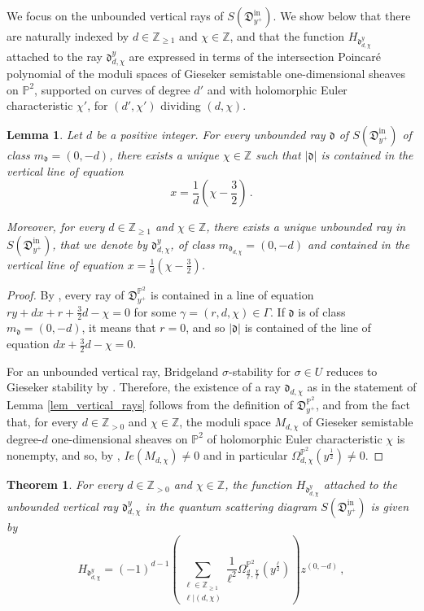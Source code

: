 \documentclass[11pt,letterpaper]{amsart}
\newtheorem{thm}[defn]{Theorem}
\newtheorem{lem}[defn]{Lemma}
\newcommand\PP{\mathbb P}
\newcommand\Z{\mathbb Z}
\newcommand\fd{\mathfrak d}
\newcommand\fD{\mathfrak D}
\newcommand\iin{\mathrm{in}}
\begin{document}
We focus on the unbounded vertical rays of $S(\fD^\iin_{y^+})$. We show below that there are naturally indexed by $d \in \Z_{\geq 1}$ and $\chi \in \Z$, and that the function 
$H_{\fd_{d,\chi}^y}$ attached to the ray $\fd_{d,\chi}^y$ are expressed in terms of the intersection 
Poincar\'e polynomial of the moduli spaces of Gieseker semistable one-dimensional sheaves on $\PP^2$, supported on curves of degree $d'$ and with
holomorphic Euler characteristic $\chi'$, for $(d',\chi')$ dividing $(d,\chi)$.

\begin{lem} \label{lem_vertical_rays_refined}
Let $d$ be a positive integer. For every unbounded ray $\fd$
of $S(\fD^\iin_{y^+})$ of class $m_\fd=(0,-d)$, there exists a unique $\chi \in \Z$ such that $|\fd|$ is contained in the vertical line of equation 
\[ x=\frac{1}{d}\left(\chi-\frac{3}{2}\right)\,.\]

Moreover, for every $d \in \Z_{\geqslant 1}$ and $\chi \in \Z$, there exists a unique unbounded ray in $S(\fD^\iin_{y^+})$, that we denote by
$\fd_{d,\chi}^y$, of class $m_{\fd_{d,\chi}}
=(0,-d)$ and contained in the vertical line of equation $ x=\frac{1}{d}\left(\chi-\frac{3}{2}\right)$.
\end{lem}

\begin{proof}
By \cite[Definition 2.5.7]{bousseau2019scattering}, every ray of $\fD^{\PP^2}_{y^+}$
is contained in a line of equation $ry+dx+r+\frac{3}{2}d-\chi=0$
for some $\gamma=(r,d,\chi)\in \Gamma$. 
If $\fd$ is of class 
$m_\fd=(0,-d)$, it means that $r=0$, and so 
$|\fd|$ is contained of the line of equation $dx+\frac{3}{2}d-\chi=0$.

For an unbounded vertical ray, Bridgeland $\sigma$-stability 
for $\sigma \in U$ reduces to Gieseker stability by 
\cite[Lemma 6.1.1]{bousseau2019scattering}.
Therefore, the existence of a ray 
$\fd_{d,\chi}$ as in the statement of 
Lemma \ref{lem_vertical_rays} follows from
the definition 
\cite[Definition 2.5.7]{bousseau2019scattering} of $\fD^{\PP^2}_{y^+}$, and from
the fact that, for every $d \in \Z_{>0}$ and 
$\chi \in \Z$, the moduli space 
$M_{d,\chi}$ of Gieseker semistable 
degree-$d$ one-dimensional sheaves on $\PP^2$ of holomorphic Euler characteristic $\chi$ is nonempty, 
and so, by \cite[Corollary 6.1.3]{bousseau2019scattering}, $Ie(M_{d,\chi})
\neq 0$ and in particular $\Omega_{d,\chi}^{\PP^2}(y^{\frac{1}{2}}) \neq 0$.
\end{proof}


\begin{thm}\label{thm_boussseau_refined}
For every $d \in \Z_{>0}$ and $\chi \in \Z$, the function 
$H_{\fd_{d,\chi}^y}$ attached to the unbounded vertical ray 
$\fd_{d,\chi}^y$ in the quantum scattering diagram $S(\fD^\iin_{y^+})$ is given by
\[ H_{\fd_{d,\chi}^y}=
(-1)^{d-1}
\left( \sum_{\substack{\ell \in \Z_{\geqslant 1} \\\ell|(d,\chi)}}
\frac{1}{\ell^2} \Omega_{\frac{d}{\ell},\frac{\chi}{\ell}}^{\PP^2}(y^{\frac{\ell}{2}})
\right) z^{(0,-d)} \,, \]
\end{thm}
\end{document}
